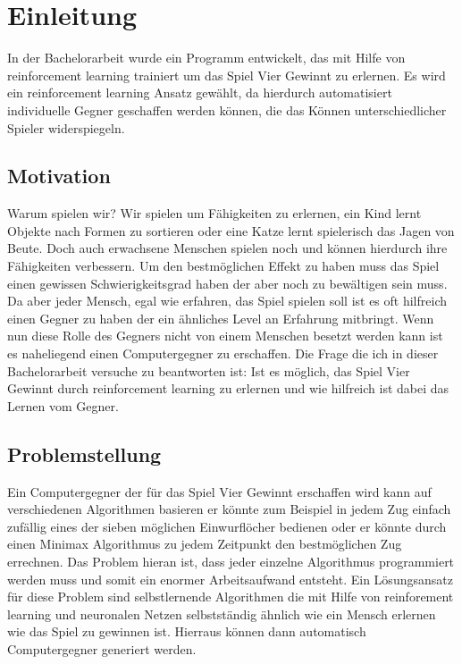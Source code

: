 \chapter{Einleitung}
\label{cha:Einleitung}

In der Bachelorarbeit wurde ein Programm entwickelt, das mit Hilfe von reinforcement learning trainiert um das Spiel Vier Gewinnt zu erlernen. 
Es wird ein reinforcement learning Ansatz gewählt, da hierdurch automatisiert individuelle Gegner geschaffen werden können, die das Können unterschiedlicher Spieler widerspiegeln.%


\section{Motivation}
Warum spielen wir? Wir spielen um Fähigkeiten zu erlernen, ein Kind lernt Objekte nach Formen zu sortieren oder eine Katze lernt spielerisch das Jagen von Beute. Doch auch erwachsene Menschen spielen noch und können hierdurch ihre Fähigkeiten verbessern. Um den bestmöglichen Effekt zu haben muss das Spiel einen gewissen Schwierigkeitsgrad haben der aber noch zu bewältigen sein muss. Da aber jeder Mensch, egal wie erfahren, das Spiel spielen soll ist es oft hilfreich einen Gegner zu haben der ein ähnliches Level an Erfahrung mitbringt. Wenn nun diese Rolle des Gegners nicht von einem Menschen besetzt werden kann ist es naheliegend einen Computergegner zu erschaffen. Die Frage die ich in dieser Bachelorarbeit versuche zu beantworten ist:   Ist es möglich, das Spiel Vier Gewinnt durch reinforcement learning zu erlernen und wie hilfreich ist dabei das Lernen vom Gegner.


\section{Problemstellung}
Ein Computergegner der für das Spiel Vier Gewinnt erschaffen wird kann auf verschiedenen Algorithmen basieren er könnte zum Beispiel in jedem Zug einfach zufällig eines der sieben möglichen Einwurflöcher bedienen oder er könnte durch einen Minimax Algorithmus zu jedem Zeitpunkt den bestmöglichen Zug errechnen. 
Das Problem hieran ist, dass jeder einzelne Algorithmus programmiert werden muss und somit ein enormer Arbeitsaufwand entsteht.
Ein Lösungsansatz für diese Problem sind selbstlernende Algorithmen die mit Hilfe von reinforement learning und neuronalen Netzen selbstständig ähnlich wie ein Mensch erlernen wie das Spiel zu gewinnen ist. Hierraus können dann automatisch Computergegner generiert werden. 

